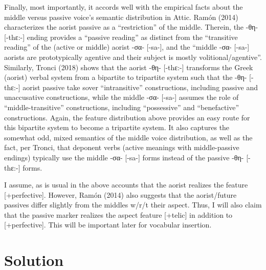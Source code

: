 \documentclass[]{ling-200b-2}
\begin{document}
Finally, most importantly, it accords well with the empirical facts about the middle versus passive voice's semantic distribution in Attic. Ram\'{o}n (2014) characterizes the aorist passive as a ``restriction'' of the middle. Therein, the -θη- [-t\super hε:-] ending provides a ``passive reading'' as distinct from the ``transitive reading'' of the (active or middle) aorist -σα- [-sa-], and the ``middle -σα- [-sa-] aorists are prototypically agentive and their subject is mostly volitional/agentive''. Similarly, Tronci (2018) shows that the aorist -θη- [-t\super hε:-] transforms the Greek (aorist) verbal system from a bipartite to tripartite system such that the -θη- [-t\super hε:-] aorist passive take sover ``intransitive'' constructions, including passive and unaccusative constructions, while the middle -σα- [-sa-] assumes the role of ``middle-transitive'' constructions, including ``possessive'' and ``benefactive'' constructions. Again, the feature distribution above provides an easy route for this bipartite system to become a tripartite system. It also captures the somewhat odd, mixed semantics of the middle voice distribution, as well as the fact, per Tronci, that deponent verbs (active meanings with middle-passive endings) typically use the middle -σα- [-sa-] forms instead of the passive -θη- [-t\super hε:-] forms.

I assume, as is usual in the above accounts that the aorist realizes the feature [+perfective]. However, Ram\'{o}n (2014) also suggests that the aorist/future passives differ slightly from the middles w/r/t their aspect. Thus, I will also claim that the passive marker realizes the aspect feature [+telic] in addition to [+perfective]. This will be important later for vocabular insertion.

\section{Solution}
\end{document}
